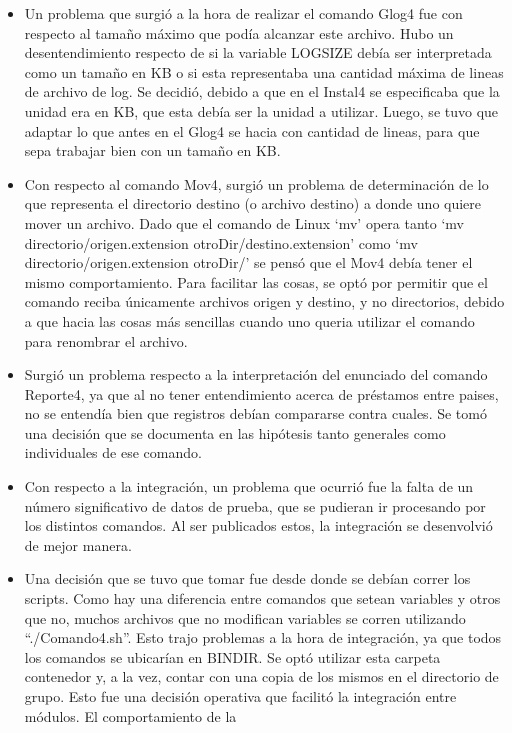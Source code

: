 \documentclass{article}
\begin{document}
	\begin{itemize}
		\item Un problema que surgió a la hora de realizar el comando Glog4 fue con respecto al tamaño máximo que podía alcanzar este archivo.
		Hubo un desentendimiento respecto de si la variable LOGSIZE debía ser interpretada como un tamaño en KB o si esta representaba una
		cantidad máxima de lineas de archivo de log. Se decidió, debido a que en el Instal4 se especificaba que la unidad era en KB, que esta debía
		ser la unidad a utilizar. Luego, se tuvo que adaptar lo que antes en el Glog4 se hacia con cantidad de lineas, para que sepa trabajar bien con
		un tamaño en KB.
		\item Con respecto al comando Mov4, surgió un problema de determinación de lo que representa el directorio destino (o archivo destino) a
		donde uno quiere mover un archivo. Dado que el comando de Linux `mv' opera tanto `mv directorio/origen.extension otroDir/destino.extension'
		como `mv directorio/origen.extension otroDir/' se pensó que el Mov4 debía tener el mismo comportamiento. Para facilitar las cosas, se optó por
		permitir que el comando reciba únicamente archivos origen y destino, y no directorios, debido a que hacia las cosas más sencillas cuando uno
		queria utilizar el comando para renombrar el archivo.
		\item Surgió un problema respecto a la interpretación del enunciado del comando Reporte4, ya que al no tener entendimiento acerca de préstamos
		entre paises, no se entendía bien que registros debían compararse contra cuales. Se tomó una decisión que se documenta en las hipótesis tanto
		generales como individuales de ese comando.
		\item Con respecto a la integración, un problema que ocurrió fue la falta de un número significativo de datos de prueba, que se pudieran ir
		procesando por los distintos comandos. Al ser publicados estos, la integración se desenvolvió de mejor manera.
		\item Una decisión que se tuvo que tomar fue desde donde se debían correr los scripts. Como hay una diferencia entre comandos que setean
		variables y otros que no, muchos archivos que no modifican variables se corren utilizando ``./Comando4.sh''. Esto trajo problemas a la hora
		de integración, ya que todos los comandos se ubicarían en BINDIR. Se optó utilizar esta carpeta contenedor y, a la vez, contar con una copia
		de los mismos en el directorio de grupo. Esto fue una decisión operativa que facilitó la integración entre módulos. El comportamiento de la

\end{itemize}
\end{document}
